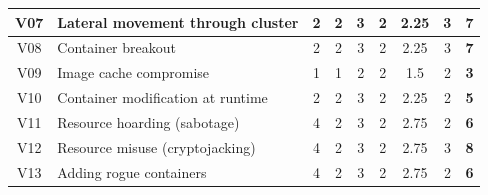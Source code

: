 \begin{landscape}
\begin{table}[]
{\begin{tabular}{|c|l|cccc|cc|c|}
V07             & Lateral movement through cluster                                                       & 2                                        & 2                              & 3                                        & 2                    & 2.25                                   & 3            & \textbf{7}           \\ \hline
V08             & Container breakout                                                                     & 2                                        & 2                              & 3                                        & 2                    & 2.25                                   & 3            & \textbf{7}           \\ \hline
V09             & Image cache compromise                                                                 & 1                                        & 1                              & 2                                        & 2                    & 1.5                                    & 2            & \textbf{3}           \\ \hline
V10             & Container modification at runtime                                                      & 2                                        & 2                              & 3                                        & 2                    & 2.25                                   & 2            & \textbf{5}           \\ \hline
V11             & Resource hoarding (sabotage)                                                           & 4                                        & 2                              & 3                                        & 2                    & 2.75                                    & 2            & \textbf{6}           \\ \hline
V12             & Resource misuse (cryptojacking)                                                        & 4                                       & 2                              & 3                                        & 2                    & 2.75                                    & 3            & \textbf{8}           \\ \hline
V13             & Adding rogue containers                                                                & 4                                        & 2                              & 3                                        & 2                    & 2.75                                   & 2            & \textbf{6}           \\ \hline

\end{tabular}}
\end{table}
\end{landscape}

